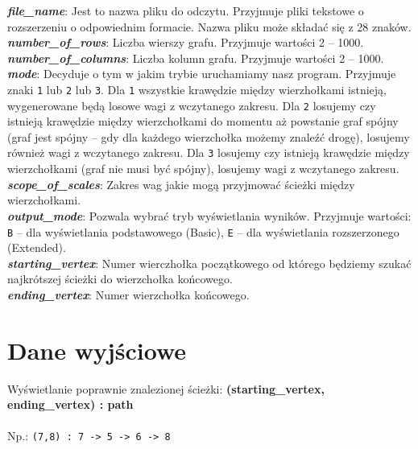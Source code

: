 \documentclass[12pt, a4paper]{article}
\begin{document}
\textbf{\textit{file\_name}}: Jest to nazwa pliku do odczytu. Przyjmuje pliki tekstowe o rozszerzeniu o odpowiednim formacie. Nazwa pliku może składać się z 28 znaków.\\

\textbf{\textit{number\_of\_rows}}: Liczba wierszy grafu. Przyjmuje wartości 2 -- 1000.\\

\textbf{\textit{number\_of\_columns}}: Liczba kolumn grafu. Przyjmuje wartości 2 -- 1000.\\

\textbf{\textit{mode}}: Decyduje o tym w jakim trybie uruchamiamy nasz program. Przyjmuje znaki \texttt{1} lub \texttt{2} lub \texttt{3}. Dla \texttt{1}  wszystkie krawędzie między wierzhołkami istnieją, wygenerowane będą losowe wagi z wczytanego zakresu. Dla \texttt{2} losujemy czy istnieją krawędzie między wierzchołkami do momentu aż powstanie graf spójny (graf jest spójny – gdy dla każdego wierzchołka możemy znaleźć drogę), losujemy również wagi z wczytanego zakresu. Dla \texttt{3} losujemy czy istnieją krawędzie między wierzchołkami (graf nie musi być spójny), losujemy wagi z wczytanego zakresu.\\

\textbf{\textit{scope\_of\_scales}}: Zakres wag jakie mogą przyjmować ścieżki między wierzchołkami.\\

\textbf{\textit{output\_mode}}: Pozwala wybrać tryb wyświetlania wyników. Przyjmuje wartości: \texttt{B} -- dla wyświetlania podstawowego (Basic), \texttt{E} -- dla wyświetlania rozszerzonego (Extended).\\

\textbf{\textit{starting\_vertex}}: Numer wierczhołka początkowego od którego będziemy szukać najkrótszej ścieżki do wierzchołka końcowego.\\

\textbf{\textit{ending\_vertex}}: Numer wierzchołka końcowego.\\


\section{Dane wyjściowe}
Wyświetlanie poprawnie znalezionej ścieżki: \textbf{(starting\_vertex, ending\_vertex) : path}\\\\
Np.: \texttt{(7,8) : 7 -> 5 -> 6 -> 8}\\
\end{document}
